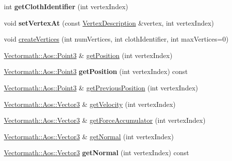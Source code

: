 \begin{DoxyCompactItemize}
\item 
\mbox{\label{classbtSoftBodyVertexData_acfc7cafd9b13f9c442af038ca8e08dfc}} 
int {\bfseries get\+Cloth\+Identifier} (int vertex\+Index)
\item 
\mbox{\label{classbtSoftBodyVertexData_a3dc301457df55b2da8bd7aea67eea552}} 
void {\bfseries set\+Vertex\+At} (const \hyperlink{classbtSoftBodyVertexData_1_1VertexDescription}{Vertex\+Description} \&vertex, int vertex\+Index)
\item 
void \hyperlink{classbtSoftBodyVertexData_ac3ec63020379a29c984904deb4fc92b2}{create\+Vertices} (int num\+Vertices, int cloth\+Identifier, int max\+Vertices=0)
\item 
\hyperlink{classVectormath_1_1Aos_1_1Point3}{Vectormath\+::\+Aos\+::\+Point3} \& \hyperlink{classbtSoftBodyVertexData_ac5d2dd4b383b386080c45a4fcf45f4f4}{get\+Position} (int vertex\+Index)
\item 
\mbox{\label{classbtSoftBodyVertexData_a9bc7e8a411d49f5ab968666788dce5cf}} 
\hyperlink{classVectormath_1_1Aos_1_1Point3}{Vectormath\+::\+Aos\+::\+Point3} {\bfseries get\+Position} (int vertex\+Index) const
\item 
\hyperlink{classVectormath_1_1Aos_1_1Point3}{Vectormath\+::\+Aos\+::\+Point3} \& \hyperlink{classbtSoftBodyVertexData_a123a978bf93f1ea06263b157e433ad97}{get\+Previous\+Position} (int vertex\+Index)
\item 
\hyperlink{classVectormath_1_1Aos_1_1Vector3}{Vectormath\+::\+Aos\+::\+Vector3} \& \hyperlink{classbtSoftBodyVertexData_ae2283fd9cc23dcaff3721fbcf26e3bad}{get\+Velocity} (int vertex\+Index)
\item 
\hyperlink{classVectormath_1_1Aos_1_1Vector3}{Vectormath\+::\+Aos\+::\+Vector3} \& \hyperlink{classbtSoftBodyVertexData_a34e1fdb82d6db75a4c22409632c3b369}{get\+Force\+Accumulator} (int vertex\+Index)
\item 
\hyperlink{classVectormath_1_1Aos_1_1Vector3}{Vectormath\+::\+Aos\+::\+Vector3} \& \hyperlink{classbtSoftBodyVertexData_a1404390d4cbbf841e1749dc1779fd104}{get\+Normal} (int vertex\+Index)
\item 
\mbox{\label{classbtSoftBodyVertexData_a72ca8247eb869e8a5ef81855f297b0d6}} 
\hyperlink{classVectormath_1_1Aos_1_1Vector3}{Vectormath\+::\+Aos\+::\+Vector3} {\bfseries get\+Normal} (int vertex\+Index) const

\end{DoxyCompactItemize}

